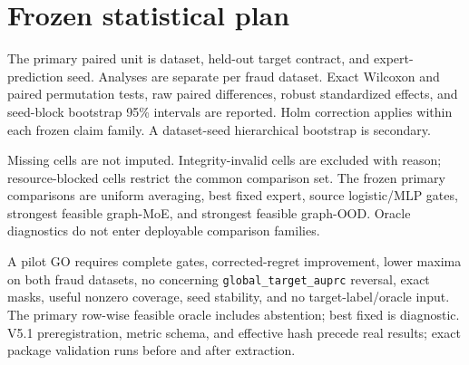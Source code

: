 \section{Frozen statistical plan}

The primary paired unit is dataset, held-out target contract, and expert-prediction seed. Analyses are separate per fraud dataset. Exact Wilcoxon and paired permutation tests, raw paired differences, robust standardized effects, and seed-block bootstrap 95\% intervals are reported. Holm correction applies within each frozen claim family. A dataset-seed hierarchical bootstrap is secondary.

Missing cells are not imputed. Integrity-invalid cells are excluded with reason; resource-blocked cells restrict the common comparison set. The frozen primary comparisons are uniform averaging, best fixed expert, source logistic/MLP gates, strongest feasible graph-MoE, and strongest feasible graph-OOD. Oracle diagnostics do not enter deployable comparison families.

A pilot GO requires complete gates, corrected-regret improvement, lower maxima on both fraud datasets, no concerning \texttt{global\_target\_auprc} reversal, exact masks, useful nonzero coverage, seed stability, and no target-label/oracle input. The primary row-wise feasible oracle includes abstention; best fixed is diagnostic. V5.1 preregistration, metric schema, and effective hash precede real results; exact package validation runs before and after extraction.
